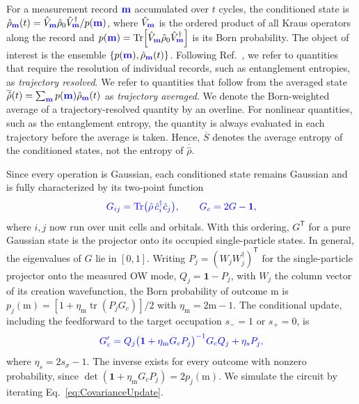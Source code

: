 \documentclass[aps,prb,10pt,twocolumn,superscriptaddress,longbibliography,floatfix]{revtex4-2}
\newcommand{\Id}{\mathbf{1}}
\newcommand{\rec}{\mathbf m}   %
\newcommand{\newtext}[1]{{\color{blue}#1}}
\begin{document}
For a measurement record $\newtext{\rec}$ accumulated over $t$ cycles, the conditioned state is $\hat\rho_{\newtext{\rec}}(t)=\hat V_{\newtext{\rec}}\hat\rho_0\hat V_{\newtext{\rec}}^\dagger/p(\newtext{\rec})$, where $\hat V_{\newtext{\rec}}$ is the ordered product of all Kraus operators along the record and $p(\newtext{\rec})=\Tr[\hat V_{\newtext{\rec}}\hat\rho_0\hat V_{\newtext{\rec}}^\dagger]$ is its Born probability. The object of interest is the ensemble $\{p(\newtext{\rec}),\hat\rho_{\newtext{\rec}}(t)\}$. Following Ref.~\cite{BhuiyanPanJian2026}, we refer to quantities that require the resolution of individual records, such as entanglement entropies, as \emph{trajectory resolved}. We refer to quantities that follow from the averaged state $\overline{\hat\rho}(t)=\sum_{\newtext{\rec}}p(\newtext{\rec})\hat\rho_{\newtext{\rec}}(t)$ as \emph{trajectory averaged}. We denote the Born-weighted average of a trajectory-resolved quantity by an overline. For nonlinear quantities, such as the entanglement entropy, the quantity is always evaluated in each trajectory before the average is taken. Hence, $\overline{S}$ denotes the average entropy of the conditioned states, not the entropy of $\overline{\hat\rho}$.

Since every operation is Gaussian, each conditioned state remains Gaussian and is fully characterized by its two-point function
\begin{equation}
    \newtext{G_{ij}=\Tr\!\big(\hat\rho\,\hat c_i^\dagger\hat c_j\big),
    \qquad G_c=2G-\Id,}
    \label{eq:TwoPoint}
\end{equation}
where $i,j$ now run over unit cells and orbitals. With this ordering, \newtext{$G^{\mathsf T}$} for a pure Gaussian state is the projector onto its occupied single-particle states. In general, \newtext{the eigenvalues of $G$} lie in $[0,1]$. Writing \newtext{$P_j=(W_jW_j^\dagger)^{\mathsf T}$} for the single-particle projector onto the measured OW mode, $Q_j=\Id-P_j$, \newtext{with $W_j$ the column vector of its creation wavefunction,} the Born probability of outcome \newtext{$\mathrm m$} is \newtext{$p_j(\mathrm m)=[1+\eta_{\mathrm m}\operatorname{tr}(P_jG_c)]/2$} with \newtext{$\eta_{\mathrm m}=2\mathrm m-1$}. The conditional update, including the feedforward to the target occupation $s_-=1$ or $s_+=0$, is~\cite{bravyi2004lagrangian,BhuiyanPanJian2026}
\begin{equation}
    \newtext{G_c'=Q_j\big(\Id+\eta_{\mathrm m}G_cP_j\big)^{-1}G_cQ_j+\eta_sP_j,}
    \label{eq:CovarianceUpdate}
\end{equation}
\newtext{where $\eta_s=2s_\sigma-1$.} The inverse exists for every outcome with nonzero probability, since \newtext{$\det(\Id+\eta_{\mathrm m}G_cP_j)=2p_j(\mathrm m)$}. We simulate the circuit by iterating Eq.~\eqref{eq:CovarianceUpdate}.
\end{document}
